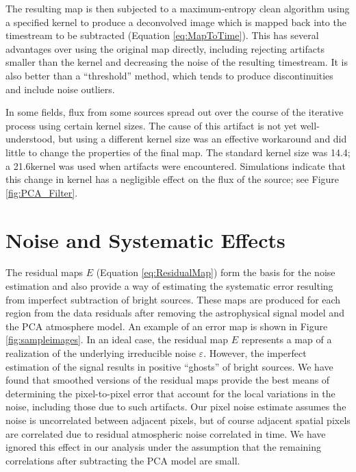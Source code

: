\documentclass{emulateapj}
\newcommand{\epsi}{\varepsilon}
\begin{document}
The resulting map is then subjected to a maximum-entropy clean
algorithm \citep{hollis92} using a specified kernel to produce a
deconvolved image which is mapped back into the timestream to be
subtracted (Equation \ref{eq:MapToTime}).  This has several advantages
over using the original map directly, including rejecting artifacts
smaller than the kernel and decreasing the noise of the resulting
timestream.  It is also better than a ``threshold'' method, which
tends to produce discontinuities and include noise outliers.

In some fields, flux from some sources spread out over the course of
the iterative process using certain kernel sizes.  The cause of this
artifact is not yet well-understood, but using a different kernel size
was an effective workaround and did little to change the properties of
the final map.  The standard kernel size was 14.4\arcsec; a
21.6\arcsec kernel was used when artifacts were encountered.
Simulations indicate that this change in kernel has a negligible
effect on the flux of the source; see Figure \ref{fig:PCA_Filter}.

\section{Noise and Systematic Effects}
\label{sec:Noise}

The residual maps $E$ (Equation \ref{eq:ResidualMap}) form the basis
for the noise estimation and also provide a way of estimating the
systematic error resulting from imperfect subtraction of bright
sources.  These maps are produced for each region from the data
residuals after removing the astrophysical signal model and the PCA
atmosphere model.  An example of an error map is shown in Figure
\ref{fig:sampleimages}.  In an ideal case, the residual map $E$
represents a map of a realization of the underlying irreducible noise
$\epsi$.  However, the imperfect estimation of the signal results in
positive ``ghosts'' of bright sources.  We have found that smoothed
versions of the residual maps provide the best means of determining
the pixel-to-pixel error that account for the local variations in the
noise, including those due to such artifacts.
Our pixel noise estimate assumes the noise is uncorrelated between
adjacent pixels, but of course adjacent spatial pixels are correlated
due to residual atmospheric noise correlated in time.  We have ignored
this effect in our analysis under the assumption that the remaining
correlations after subtracting the PCA model are small.
\end{document}
